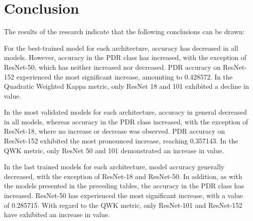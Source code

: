 \section{Conclusion}
\label{sec:conclusion}

The results of the research indicate that the following conclusions can be drawn:

For the best-trained model for each architecture, accuracy has decreased in all models. However, accuracy in the PDR class has increased, with the exception of ResNet-50, which has neither increased nor decreased. PDR accuracy on ResNet-152 experienced the most significant increase, amounting to 0.428572. In the Quadratic Weighted Kappa metric, only ResNet 18 and 101 exhibited a decline in value.

In the most validated models for each architecture, accuracy in general decreased in all models, whereas accuracy in the PDR class increased, with the exception of ResNet-18, where no increase or decrease was observed. PDR accuracy on ResNet-152 exhibited the most pronounced increase, reaching 0.357143. In the QWK metric, only ResNet 50 and 101 demonstrated an increase in value.

In the last trained models for each architecture, model accuracy generally decreased, with the exception of ResNet-18 and ResNet-50. In addition, as with the models presented in the preceding tables, the accuracy in the PDR class has increased. ResNet-50 has experienced the most significant increase, with a value of 0.285715. With regard to the QWK metric, only ResNet-101 and ResNet-152 have exhibited an increase in value.
